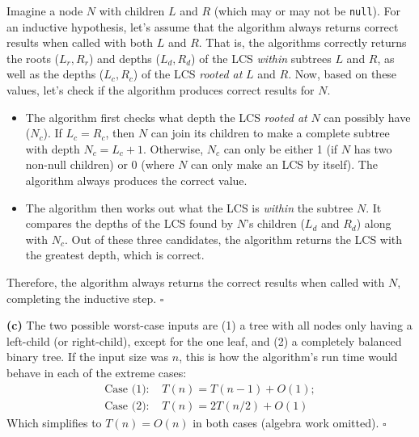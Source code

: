 \documentclass{article}
\begin{document}
\begin{enumerate}
    Imagine a node $N$ with children $L$ and $R$ (which may or may not be \texttt{null}). For an inductive hypothesis, let's assume that the algorithm always returns correct results when called with both $L$ and $R$. That is, the algorithms correctly returns the roots ($L_r,R_r$) and depths ($L_d,R_d$) of the LCS \textit{within} subtrees $L$ and $R$, as well as the depths ($L_c,R_c$) of the LCS \textit{rooted at} $L$ and $R$. Now, based on these values, let's check if the algorithm produces correct results for $N$.
    \begin{itemize}
      \item The algorithm first checks what depth the LCS \textit{rooted at} $N$ can possibly have ($N_c$). If $L_c=R_c$, then $N$ can join its children to make a complete subtree with depth $N_c=L_c+1$. Otherwise, $N_c$ can only be either 1 (if $N$ has two non-null children) or 0 (where $N$ can only make an LCS by itself). The algorithm always produces the correct value.

      \item The algorithm then works out what the LCS is \textit{within} the subtree $N$. It compares the depths of the LCS found by $N$'s children ($L_d$ and $R_d$) along with $N_c$. Out of these three candidates, the algorithm returns the LCS with the greatest depth, which is correct.
    \end{itemize}
    Therefore, the algorithm always returns the correct results when called with $N$, completing the inductive step. $\square$

    \textbf{(c)} The two possible worst-case inputs are (1) a tree with all nodes only having a left-child (or right-child), except for the one leaf, and (2) a completely balanced binary tree. If the input size was $n$, this is how the algorithm's run time would behave in each of the extreme cases:
    $$
      \begin{aligned}
        \text{Case (1): } & T(n) = T(n - 1) + O(1); \\
        \text{Case (2): } & T(n) = 2T(n/2) + O(1)
      \end{aligned}
    $$
    Which simplifies to $T(n) = O(n)$ in both cases (algebra work omitted). $\square$

\end{enumerate}
\end{document}
